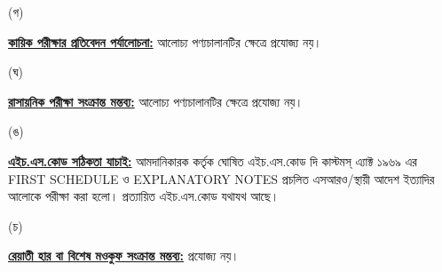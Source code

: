\documentclass[12pt]{article}
\begin{document}
\begin{minipage}[t]{0.05\linewidth}
\hspace{1em}
\end{minipage}
\begin{minipage}[t]{0.05\linewidth}
(গ)
\end{minipage}
\begin{minipage}[t]{0.90\linewidth}
\underline{\textbf{কায়িক পরীক্ষার প্রতিবেদন পর্যালোচনা:}}
আলোচ্য পণ্যচালানটির ক্ষেত্রে প্রযোজ্য নয়।
\\
\end{minipage}
\begin{minipage}[t]{0.05\linewidth}
\hspace{1em}
\end{minipage}
\begin{minipage}[t]{0.05\linewidth}
(ঘ)
\end{minipage}
\begin{minipage}[t]{0.90\linewidth}
\underline{\textbf{রাসায়নিক পরীক্ষা সংক্রান্ত মন্তব্য:}}
আলোচ্য পণ্যচালানটির ক্ষেত্রে প্রযোজ্য নয়।
\\
\end{minipage}
\begin{minipage}[t]{0.05\linewidth}
\hspace{1em}
\end{minipage}
\begin{minipage}[t]{0.05\linewidth}
(ঙ)
\end{minipage}
\begin{minipage}[t]{0.90\linewidth}
\underline{\textbf{এইচ.এস.কোড সঠিকতা যাচাই:}}
আমদানিকারক কর্তৃক ঘোষিত এইচ.এস.কোড দি কাস্টমস্ এ্যাক্ট ১৯৬৯ এর FIRST SCHEDULE ও
EXPLANATORY NOTES প্রচলিত এসআরও/স্থায়ী আদেশ ইত্যাদির আলোকে পরীক্ষা করা হলো।
প্রত্যায়িত এইচ.এস.কোড যথাযথ আছে।
\\
\end{minipage}
\newpage
\noindent
\begin{minipage}[t]{0.05\linewidth}
\hspace{1em}
\end{minipage}
\begin{minipage}[t]{0.05\linewidth}
(চ)
\end{minipage}
\begin{minipage}[t]{0.90\linewidth}
\underline{\textbf{রেয়াতী হার বা বিশেষ মওকুফ সংক্রান্ত মন্তব্য:}}
প্রযোজ্য নয়।
\\
\end{minipage}
\end{document}
